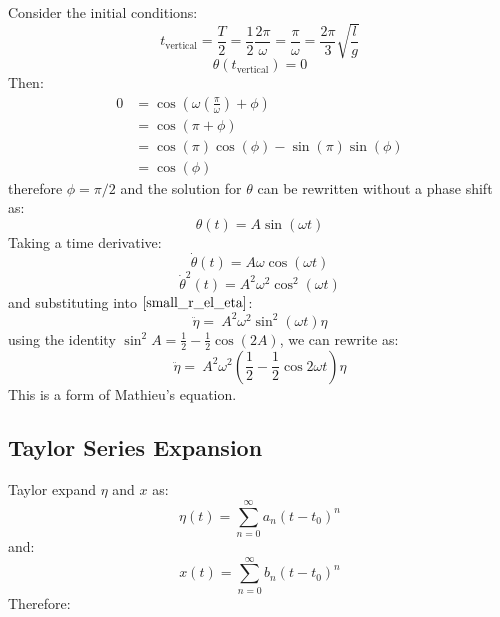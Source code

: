 \documentclass[9pt]{report}
\begin{document}
\begin{enumerate}
Consider the initial conditions:
\[
  t_\text{vertical} = \frac{T}{2} = \frac{1}{2} \frac{2\pi}{\omega} = \frac{\pi}{\omega} = \frac{2\pi}{3}\sqrt{\frac{l}{g}}
\]  
\[
 \theta(t_\text{vertical}) = 0
\]
Then:
\[
\begin{align}
0 &= \cos(\omega (\frac{\pi}{\omega}) + \phi) \\
  &= \cos(\pi + \phi)\\
  &= \cos(\pi)\cos(\phi)-\sin(\pi)\sin(\phi)\\
  &= \cos(\phi)
\end{align}
\]
therefore $\phi = \pi/2$ and the solution for $\theta$ can be rewritten without
a phase shift as:
\[
  \theta(t) = A \sin(\omega t)
\]
Taking a time derivative:
\[
\dot{\theta}(t) = A\omega \cos (\omega t)
\]
\[
\dot{\theta}^2(t) = A^2\omega^2 \cos^2 (\omega t)
\]
and substituting into $\ref{small_r_el_eta}$:
\[
\ddot{\eta} = \ A^2 \omega^2 \sin^2 (\omega t) \eta
\]
using the identity $\sin^2A = \frac{1}{2} - \frac{1}{2} \cos(2A)$, we can
rewrite as:
\[
  \ddot{\eta} = \ A^2 \omega^2 (\frac{1}{2} - \frac{1}{2} \cos 2\omega t) \eta
\]
This is a form of Mathieu's equation.

\subsection{Taylor Series Expansion}
Taylor expand $\eta$ and $x$ as:
\[
  \eta(t) = \sum_{n=0}^\infty a_n (t-t_0)^n
\]
and:
\[
  x(t) = \sum_{n=0}^\infty b_n (t-t_0)^n
\]
Therefore:
\end{enumerate}
\end{document}
